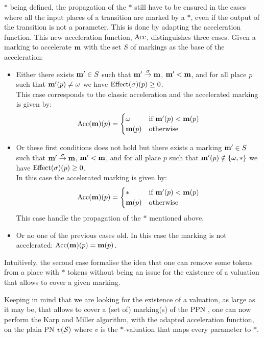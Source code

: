 $*$ being defined, the propagation of the $*$ still have to be ensured in the cases where all the input places of a transition are marked by a $*$, even if the output of the transition is not a parameter.
This is done by adapting the acceleration function.
This new acceleration function, $\operatorname{Acc}$, distinguishes three cases.
Given a marking to accelerate $\mathbf{m}$ with the set $S$ of markings as the base of the acceleration:
\begin{itemize}
  \item Either there exists $\mathbf{m'} \in S$ such that $\mathbf{m'} \stackrel{\sigma}{\to} \mathbf{m}$, $\mathbf{m'} < \mathbf{m}$, and for all place $p$ such that $\mathbf{m'}(p) \neq \omega$ we have $\operatorname{Effect}(\sigma)(p) \geq 0$.\\
    This case corresponds to the classic acceleration and
    the accelerated marking is given by:
    \[
      \operatorname{Acc}(\mathbf{m})(p) = \begin{cases} \omega &\text{if } \mathbf{m'}(p) < \mathbf{m}(p) \\ \mathbf{m}(p) &\text{otherwise} \end{cases}
    \]
  \item Or these first conditions does not hold but there exists a marking $\mathbf{m'} \in S$ such that $\mathbf{m'} \stackrel{\sigma}{\to} \mathbf{m}$, $\mathbf{m'} < \mathbf{m}$, and for all place $p$ such that $\mathbf{m'}(p) \notin \{\omega, *\}$ we have $\operatorname{Effect}(\sigma)(p) \geq 0$.\\
    In this case
    the accelerated marking is given by:
    \[
      \operatorname{Acc}(\mathbf{m})(p) = \begin{cases} * &\text{if } \mathbf{m'}(p) < \mathbf{m}(p) \\ \mathbf{m}(p) &\text{otherwise} \end{cases}
    \]
    This case handle the propagation of the $*$ mentioned above.
  \item Or no one of the previous cases old.
    In this case the marking is not accelerated: $\operatorname{Acc}(\mathbf{m})(p) = \mathbf{m}(p)$.
\end{itemize}

Intuitively, the second case formalise the idea that one can remove some tokens from a place with $*$ tokens without being an issue for the existence of a valuation that allows to cover a given marking.

Keeping in mind that we are looking for the existence of a valuation, as large as it may be, that allows to cover a (set of) marking(s) of the \ac{PPN} \PPN, one can now perform the Karp and Miller algorithm, with the adapted acceleration function, on the plain \ac{PN} $v(\mathcal{S})$ where $v$ is the $*$-valuation that maps every parameter to $*$.

